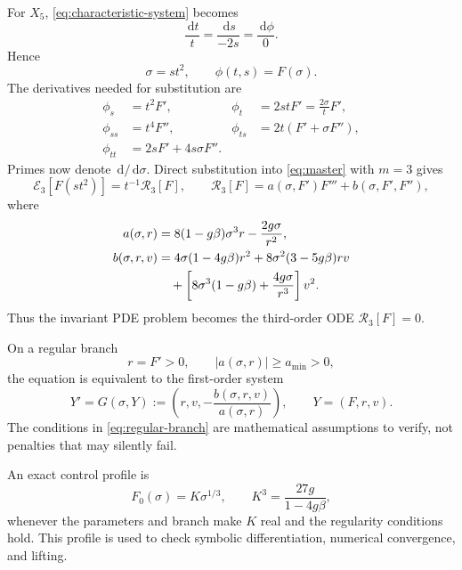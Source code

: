 \documentclass[11pt]{article}
\newcommand{\E}{\mathcal E}
\newcommand{\R}{\mathcal R}
\newcommand{\dd}{\,\mathrm d}
\begin{document}
For $X_5$, \cref{eq:characteristic-system} becomes
\begin{equation}
 \frac{\dd t}{t}=\frac{\dd s}{-2s}=\frac{\dd\phi}{0}.
\end{equation}
Hence
\begin{equation}
 \sigma=st^2,
 \qquad \phi(t,s)=F(\sigma).
 \label{eq:invariant-ansatz}
\end{equation}
The derivatives needed for substitution are
\begin{align}
 \phi_s&=t^2F', & \phi_t&=2stF'=\frac{2\sigma}{t}F',\\
 \phi_{ss}&=t^4F'', & \phi_{ts}&=2t(F'+\sigma F''),\\
 \phi_{tt}&=2sF'+4s\sigma F''.
 \label{eq:derivatives}
\end{align}
Primes now denote $\dd/\dd\sigma$.  Direct substitution into \cref{eq:master} with $m=3$ gives
\begin{equation}
 \E_3[F(st^2)]=t^{-1}\R_3[F],
 \qquad
 \R_3[F]=a(\sigma,F')F'''+b(\sigma,F',F''),
 \label{eq:lift-exact}
\end{equation}
where
\begin{align}
 a(\sigma,r)&=8(1-g\beta)\sigma^3r-\frac{2g\sigma}{r^2},\label{eq:a}\\
 b(\sigma,r,v)&=4\sigma(1-4g\beta)r^2
 +8\sigma^2(3-5g\beta)rv\notag\\
 &\quad+\left[8\sigma^3(1-g\beta)+\frac{4g\sigma}{r^3}\right]v^2.
 \label{eq:b}
\end{align}
Thus the invariant PDE problem becomes the third-order ODE $\R_3[F]=0$.

On a regular branch
\begin{equation}
 r=F'>0,
 \qquad |a(\sigma,r)|\ge a_{\min}>0,
 \label{eq:regular-branch}
\end{equation}
the equation is equivalent to the first-order system
\begin{equation}
 Y'=G(\sigma,Y)
 :=\left(r,v,-\frac{b(\sigma,r,v)}{a(\sigma,r)}\right),
 \qquad Y=(F,r,v).
 \label{eq:first-order}
\end{equation}
The conditions in \cref{eq:regular-branch} are mathematical assumptions to verify, not penalties that may silently fail.

An exact control profile is
\begin{equation}
 F_0(\sigma)=K\sigma^{1/3},
 \qquad K^3=\frac{27g}{1-4g\beta},
 \label{eq:control}
\end{equation}
whenever the parameters and branch make $K$ real and the regularity conditions hold.  This profile is used to check symbolic differentiation, numerical convergence, and lifting.
\end{document}
